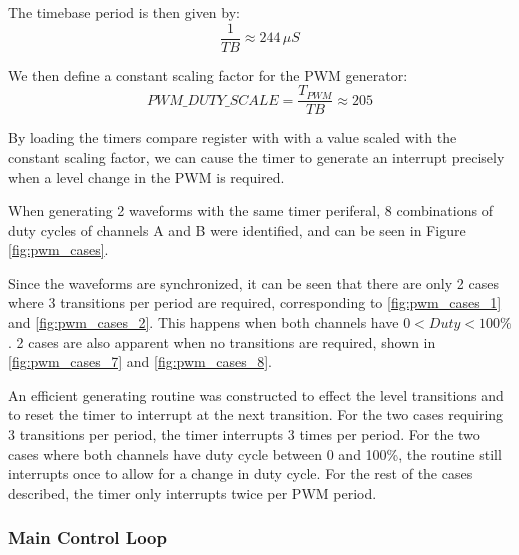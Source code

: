 The timebase period is then given by:
\begin{equation}
\frac{1}{TB}\approx244\,\mu{S}
\end{equation}

We then define a constant scaling factor for the PWM generator:
\begin{equation}
{PWM\_DUTY\_SCALE}=\frac{T_{PWM}}{TB}\approx205
\end{equation}

By loading the timers compare register with with a value scaled with the constant scaling factor, we can cause the timer to generate an interrupt precisely when a level change in the PWM is required.

When generating 2 waveforms with the same timer periferal, 8 combinations of duty cycles of channels A and B were identified, and can be seen in Figure \ref{fig:pwm_cases}.

Since the waveforms are synchronized, it can be seen that there are only 2 cases where 3 transitions per period are required, corresponding to \ref{fig:pwm_cases_1} and \ref{fig:pwm_cases_2}. This happens when both channels have $0<Duty<100\%$. 2 cases are also apparent when no transitions are required, shown in \ref{fig:pwm_cases_7} and \ref{fig:pwm_cases_8}.

An efficient generating routine was constructed to effect the level transitions and to reset the timer to interrupt at the next transition. For the two cases requiring 3 transitions per period, the timer interrupts 3 times per period. For the two cases where both channels have duty cycle between 0 and 100\%, the routine still interrupts once to allow for a change in duty cycle. For the rest of the cases described, the timer only interrupts twice per PWM period.



\subsubsection{Main Control Loop}